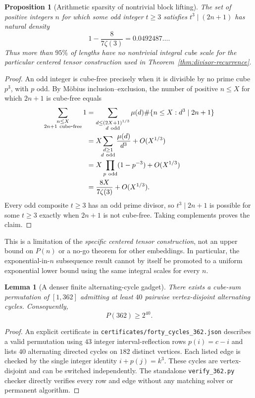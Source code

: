 \documentclass[10pt]{article}
\newtheorem{lemma}{Lemma}
\newtheorem{proposition}{Proposition}
\begin{document}
\begin{proposition}[Arithmetic sparsity of nontrivial block lifting]
\label{prop:cubefree}
The set of positive integers $n$ for which
some odd integer $t\ge3$ satisfies
$t^3\mid(2n+1)$ has natural density
\[
\boxed{\displaystyle
1-\frac{8}{7\zeta(3)}
=0.0492487\ldots.}
\]
Thus more than $95\%$ of lengths have no
nontrivial integral cube scale for the
particular centered tensor construction
used in Theorem~\ref{thm:divisor-recurrence}.
\end{proposition}
\begin{proof}
An odd integer is cube-free precisely
when it is divisible by no prime cube
$p^3$, with $p$ odd. By
Möbius inclusion--exclusion, the number
of positive $n\le X$ for which
$2n+1$ is cube-free equals
\[
\begin{aligned}
\sum_{\substack{n\le X\\ 2n+1\ {\rm cube\mbox{-}free}}}1
&=\sum_{\substack{d\le(2X+1)^{1/3}\\d\ {\rm odd}}}
 \mu(d)\#\{n\le X:d^3\mid2n+1\}\\
&=X\!\!\sum_{\substack{d\ge1\\d\ {\rm odd}}}
  \frac{\mu(d)}{d^3}
  +O(X^{1/3})\\
&=X\prod_{p\ {\rm odd}}(1-p^{-3})
  +O(X^{1/3})\\
&=\frac{8X}{7\zeta(3)}+O(X^{1/3}).
\end{aligned}
\]
Every odd composite $t\ge3$ has an odd
prime divisor, so $t^3\mid2n+1$
is possible for some $t\ge3$ exactly
when $2n+1$ is not cube-free.
Taking complements proves the claim.
\end{proof}

This is a limitation of the \emph{specific
centered tensor construction}, not an
upper bound on $P(n)$ or a no-go
theorem for other embeddings.
In particular, the exponential-in-$n$
subsequence result cannot by itself
be promoted to a uniform exponential
lower bound using the same integral
scales for every $n$.

\begin{lemma}[A denser finite alternating-cycle gadget]
\label{lem:362}
There exists a cube-sum permutation of
$[1,362]$ admitting at least $40$ pairwise
vertex-disjoint alternating cycles.
Consequently,
\[
\boxed{P(362)\ge 2^{40}.}
\]
\end{lemma}
\begin{proof}
An explicit certificate in
\texttt{certificates/forty\_cycles\_362.json}
describes a valid permutation using
$43$ integer interval-reflection rows
$p(i)=c-i$ and lists $40$ alternating
directed cycles on $182$ distinct vertices.
Each listed edge is checked by the
single integer identity $i+p(j)=k^3$.
These cycles are vertex-disjoint and can
be switched independently. The standalone
\texttt{verify\_362.py} checker directly
verifies every row and edge without any
matching solver or permanent algorithm.
\end{proof}
\end{document}
